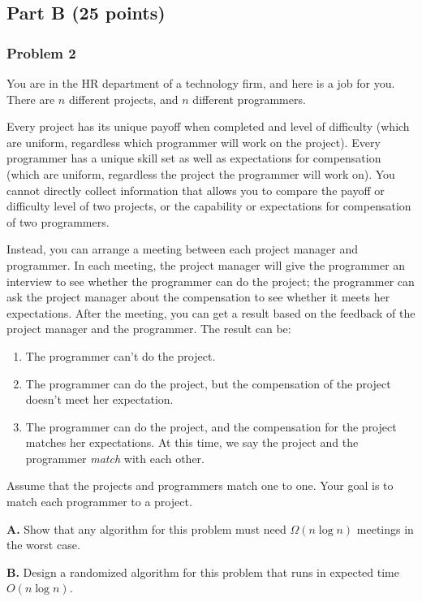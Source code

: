 \documentclass[11pt]{article}
\begin{document}
\subsection*{Part B (25 points)}

\subsubsection*{Problem 2} 

You are in the HR department of a
technology firm, and here is a job for you.  There are $n$ different
projects, and $n$ different programmers.

Every project has its unique payoff when completed and level of
difficulty (which are uniform, regardless which programmer will work
on the project).  Every programmer has a unique skill set as well as
expectations for compensation (which are uniform, regardless the
project the programmer will work on). You cannot directly collect
information that allows you to compare the payoff or difficulty level
of two projects, or the capability or expectations for compensation of
two programmers.

Instead, you can arrange a meeting between each project manager and
programmer.  In each meeting, the project manager will give the
programmer an interview to see whether the programmer can do the
project; the programmer can ask the project manager about the
compensation to see whether it meets her expectations.  After the
meeting, you can get a result based on the feedback of the project
manager and the programmer.  The result can be:

\begin{enumerate}
  \item The programmer can't do the project.
  \item The programmer can do the project, but the compensation of the
    project doesn't meet her expectation.
  \item The programmer can do the project, and the compensation for
    the project matches her expectations. At this time, we say the
    project and the programmer \textit{match} with each other.
\end{enumerate}

Assume that the projects and programmers match one to one. Your goal
is to match each programmer to a project.

{\bf A.} Show that any algorithm for this problem must need $\Omega( n
\log{n} )$ meetings in the worst case.

{\bf B.}  Design a randomized algorithm for this problem that runs in
expected time $O ( n \log{n} )$.
\end{document}
